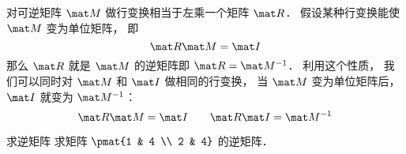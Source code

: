 
\begin{issues}
\issueDraft
\end{issues}


对可逆矩阵 $\mat M$ 做行变换相当于左乘一个矩阵 $\mat R$． 假设某种行变换能使 $\mat M$ 变为单位矩阵， 即
\begin{equation}
\mat R \mat M = \mat I
\end{equation}
那么 $\mat R$ 就是 $\mat M$ 的逆矩阵即 $\mat R = \mat M^{-1}$． 利用这个性质， 我们可以同时对 $\mat M$ 和 $\mat I$ 做相同的行变换， 当 $\mat M$ 变为单位矩阵后， $\mat I$ 就变为 $\mat M^{-1}$：
\begin{equation}
\mat R\mat M = \mat I
\qquad
\mat R \mat I = \mat M^{-1}
\end{equation}

\begin{example}{求逆矩阵}
求矩阵 $\pmat{1 & 4 \\ 2 & 4}$ 的逆矩阵．
\end{example}
